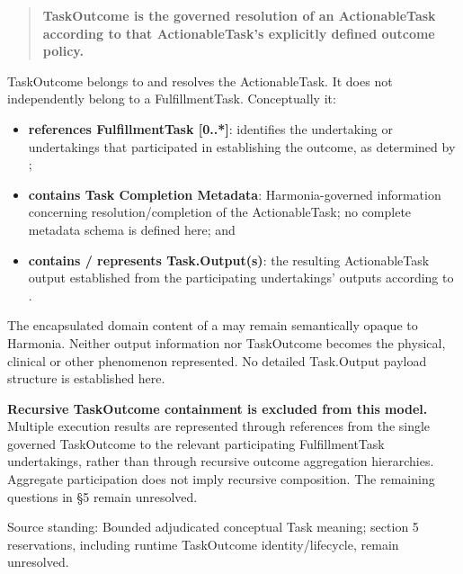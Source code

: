 \begin{quote}


\textbf{TaskOutcome is the governed resolution of an ActionableTask according to
that ActionableTask's explicitly defined outcome policy.}



\end{quote}


TaskOutcome belongs to and resolves the ActionableTask. It does not
independently belong to a FulfillmentTask. Conceptually it:



\begin{itemize}


\item \textbf{references FulfillmentTask [0..*]}: identifies the undertaking or
  undertakings that participated in establishing the outcome, as determined
  by \texttt{};

\item \textbf{contains Task Completion Metadata}: Harmonia-governed information
  concerning resolution/completion of the ActionableTask; no complete
  metadata schema is defined here; and

\item \textbf{contains / represents Task.Output(s)}: the resulting ActionableTask
  output established from the participating undertakings' outputs according
  to \texttt{}.

\end{itemize}


The encapsulated domain content of a \texttt{} may remain semantically
opaque to Harmonia. Neither output information nor TaskOutcome becomes the
physical, clinical or other phenomenon represented. No detailed Task.Output
payload structure is established here.



\textbf{Recursive TaskOutcome containment is excluded from this model.} Multiple
execution results are represented through references from the single
governed TaskOutcome to the relevant participating FulfillmentTask
undertakings, rather than through recursive outcome aggregation hierarchies.
Aggregate participation does not imply recursive composition. The remaining
questions in §5 remain unresolved.



Source standing: Bounded adjudicated conceptual Task meaning; section 5 reservations, including runtime TaskOutcome identity/lifecycle, remain unresolved.



